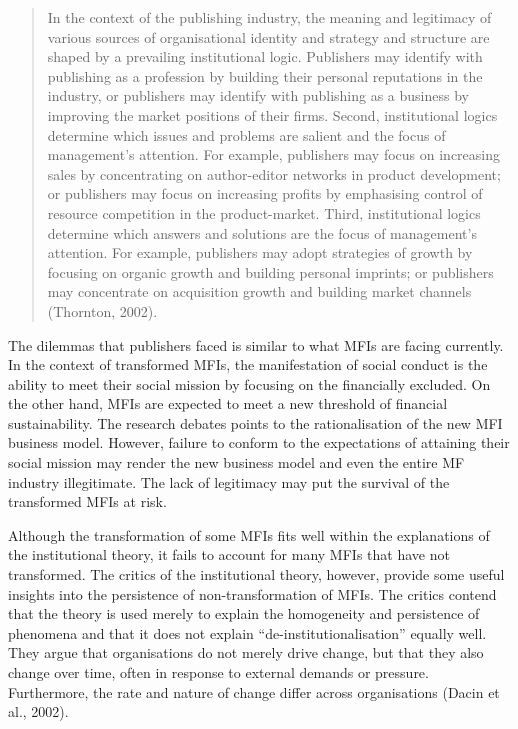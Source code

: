 \documentclass[a4paper, nobind]{templates/ociamthesis}
\begin{document}
\begin{quote}
In the context of the publishing industry, the meaning and legitimacy of various sources of organisational identity and strategy and structure are shaped by a prevailing institutional logic. Publishers may identify with publishing as a profession by building their personal reputations in the industry, or publishers may identify with publishing as a business by improving the market positions of their firms. Second, institutional logics determine which issues and problems are salient and the focus of management's attention. For example, publishers may focus on increasing sales by concentrating on author-editor networks in product development; or publishers may focus on increasing profits by emphasising control of resource competition in the product-market. Third, institutional logics determine which answers and solutions are the focus of management's attention. For example, publishers may adopt strategies of growth by focusing on organic growth and building personal imprints; or publishers may concentrate on acquisition growth and building market channels (Thornton, 2002).
\end{quote}

The dilemmas that publishers faced is similar to what MFIs are facing currently. In the context of transformed MFIs, the manifestation of social conduct is the ability to meet their social mission by focusing on the financially excluded. On the other hand, MFIs are expected to meet a new threshold of financial sustainability. The research debates points to the rationalisation of the new MFI business model. However, failure to conform to the expectations of attaining their social mission may render the new business model and even the entire MF industry illegitimate. The lack of legitimacy may put the survival of the transformed MFIs at risk.

Although the transformation of some MFIs fits well within the explanations of the institutional theory, it fails to account for many MFIs that have not transformed. The critics of the institutional theory, however, provide some useful insights into the persistence of non-transformation of MFIs. The critics contend that the theory is used merely to explain the homogeneity and persistence of phenomena and that it does not explain ``de-institutionalisation'' equally well. They argue that organisations do not merely drive change, but that they also change over time, often in response to external demands or pressure. Furthermore, the rate and nature of change differ across organisations (Dacin et al., 2002).
\end{document}
